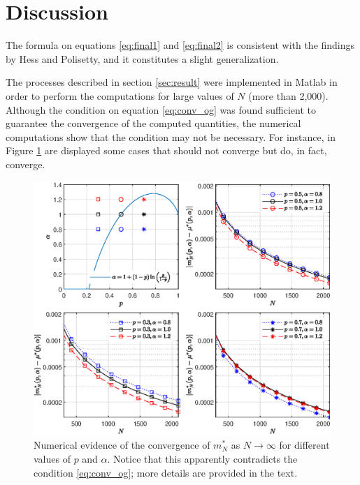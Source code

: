 \documentclass{article}
\begin{document}
\section{Discussion}

The formula on equations \eqref{eq:final1} and \eqref{eq:final2} is consistent with the findings by Hess and Polisetty, and it constitutes a slight generalization.

%
The processes described in section \ref{sec:result} were implemented in Matlab in order to perform the computations for large values of $N$ (more than 2,000).
%
Although the condition on equation \eqref{eq:conv_og} was found sufficient to guarantee the convergence of the computed quantities, the numerical computations show that the condition may not be necessary.
%
For instance, in Figure \ref{fig:onlyfig} are displayed some cases that should not converge but do, in fact, converge.

\begin{figure}
    \centering
    \includegraphics[width=\linewidth]{./img/paradox02.eps}
    \caption{Numerical evidence of the convergence of $m^*_N$ as $N\rightarrow \infty$ for different values of $p$ and $\alpha$. Notice that this apparently contradicts the condition \eqref{eq:conv_og}; more details are provided in the text.}
    \label{fig:onlyfig}
\end{figure}
\end{document}

